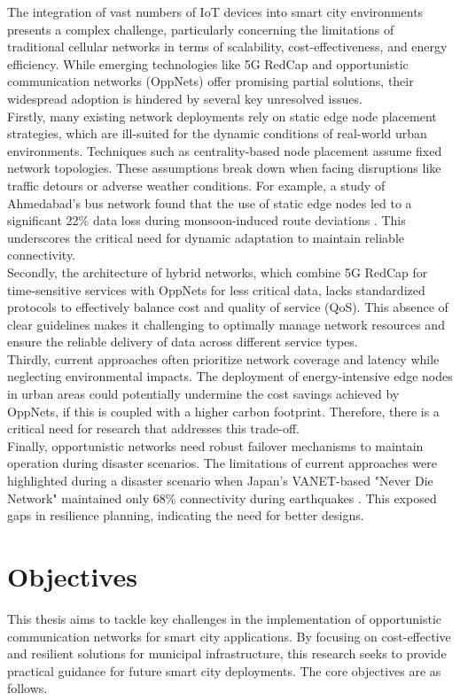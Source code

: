 \documentclass[10pt,a4paper]{report}
\begin{document}
The integration of vast numbers of IoT devices into smart city environments
presents a complex challenge, particularly concerning the limitations of
traditional cellular networks in terms of scalability, cost-effectiveness, and
energy efficiency. While emerging technologies like 5G RedCap and opportunistic
communication networks (OppNets) offer promising partial solutions, their
widespread adoption is hindered by several key unresolved issues.\\
Firstly, many existing network deployments rely on static edge node placement
strategies, which are ill-suited for the dynamic conditions of real-world urban
environments. Techniques such as centrality-based node placement assume fixed
network topologies. These assumptions break down when facing disruptions like
traffic detours or adverse weather conditions. For example, a study of Ahmedabad's
bus network found that the use of static edge nodes led to a significant 22\%
data loss during monsoon-induced route deviations \cite{Gandhi_2023}.
This underscores the critical need for dynamic adaptation to maintain reliable
connectivity.\\
Secondly, the architecture of hybrid networks, which combine 5G RedCap for
time-sensitive services with OppNets for less critical data, lacks standardized
protocols to effectively balance cost and quality of service (QoS). This absence
of clear guidelines makes it challenging to optimally manage network resources
and ensure the reliable delivery of data across different service types.\\
Thirdly, current approaches often prioritize network coverage and latency while
neglecting environmental impacts. The deployment of energy-intensive edge nodes
in urban areas could potentially undermine the cost savings achieved by OppNets,
if this is coupled with a higher carbon footprint. Therefore, there is a critical
need for research that addresses this trade-off.\\
Finally, opportunistic networks need robust failover mechanisms to maintain
operation during disaster scenarios. The limitations of current approaches were
highlighted during a disaster scenario when Japan's VANET-based "Never Die Network"
maintained only 68\% connectivity during earthquakes \cite{Andersson_2014}. This
exposed gaps in resilience planning, indicating the need for better designs.

\pagebreak

\section{Objectives}
This thesis aims to tackle key challenges in the implementation of opportunistic
communication networks for smart city applications. By focusing on cost-effective
and resilient solutions for municipal infrastructure, this research seeks to
provide practical guidance for future smart city deployments. The core objectives
are as follows.
\end{document}
